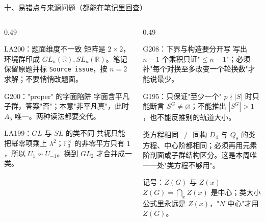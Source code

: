 \documentclass[aspectratio=169,10pt,fontset=none]{ctexbeamer}
\begin{document}
\begin{frame}[t]{十、易错点与来源问题（都能在笔记里回查）}
  \begin{columns}[T,onlytextwidth]
    \begin{column}{0.49\textwidth}
      \begin{alertblock}{\footnotesize LA200：题面维度不一致}
        \scriptsize
        矩阵是 $2\times2$，环境群印成 $GL_n(\mathbb R),SL_n(\mathbb R)$。笔记保留原题并标 \texttt{Source issue}，按 $n=2$ 求解；不要悄悄改题面。
      \end{alertblock}
      \begin{alertblock}{\footnotesize G200："proper" 的字面陷阱}
        \scriptsize
        字面含平凡子群，答案"否"；本意"非平凡真"，此时 $A_5$ 唯一。两种读法都要交代。
      \end{alertblock}
      \begin{alertblock}{\footnotesize LA199：$GL$ 与 $SL$ 的类不同}
        \scriptsize
        共轭只能把幂零项乘上 $\lambda^2$；$\mathbb F_3^\times$ 的非零平方只有 $1$，所以 $U_1\nsim U_{-1}$。换到 $GL_2$ 才合并成一类。
      \end{alertblock}
    \end{column}
    \begin{column}{0.49\textwidth}
      \begin{alertblock}{\footnotesize G208：下界与构造要分开写}
        \scriptsize
        写出 $n-1$ 个乘积只证"$\le n-1$"；必须补"每个对换至多改变一个轮换数"才能说最少。
      \end{alertblock}
      \begin{alertblock}{\footnotesize G195：只保证"至少一个"}
        \scriptsize
        $p\nmid|S|$ 时只能断言 $S^G\ne\varnothing$；不能推出 $|S^G|>1$，也不能反推别的轨道大小。
      \end{alertblock}
      \begin{alertblock}{\footnotesize 类方程相同 $\ne$ 同构}
        \scriptsize
        $D_4$ 与 $Q_8$ 的类方程、中心阶都相同；必须再用元素阶剖面或子群结构区分。这是本周唯一一处"类方程不够用"。
      \end{alertblock}
      \begin{alertblock}{\footnotesize 记号：$Z(G)$ 与 $Z(x)$}
        \scriptsize
        $Z(G)=\bigcap_x Z(x)$ 是中心；类大小公式里永远是 $Z(x)$，"$N$ 中心"才用 $Z(G)$。
      \end{alertblock}
    \end{column}
  \end{columns}
\end{frame}
\end{document}
